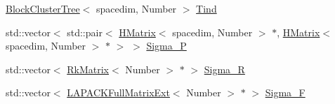 \begin{DoxyCompactItemize}
\item 
\hyperlink{classBlockClusterTree}{Block\+Cluster\+Tree}$<$ spacedim, Number $>$ \hyperlink{classHMatrix_a12da9454687e5ca15837d63e2bf0b595}{Tind}
\item 
std\+::vector$<$ std\+::pair$<$ \hyperlink{classHMatrix}{H\+Matrix}$<$ spacedim, Number $>$ $\ast$, \hyperlink{classHMatrix}{H\+Matrix}$<$ spacedim, Number $>$ $\ast$ $>$ $>$ \hyperlink{classHMatrix_a3d96d0252ef8c873ae06cf87874acaf3}{Sigma\+\_\+P}
\item 
std\+::vector$<$ \hyperlink{classRkMatrix}{Rk\+Matrix}$<$ Number $>$ $\ast$ $>$ \hyperlink{classHMatrix_a04d341b4e606d1be2d71b8ea636efe7b}{Sigma\+\_\+R}
\item 
std\+::vector$<$ \hyperlink{classLAPACKFullMatrixExt}{L\+A\+P\+A\+C\+K\+Full\+Matrix\+Ext}$<$ Number $>$ $\ast$ $>$ \hyperlink{classHMatrix_aa659b6df63d533432ec1a24435cd9c40}{Sigma\+\_\+F}
\end{DoxyCompactItemize}

